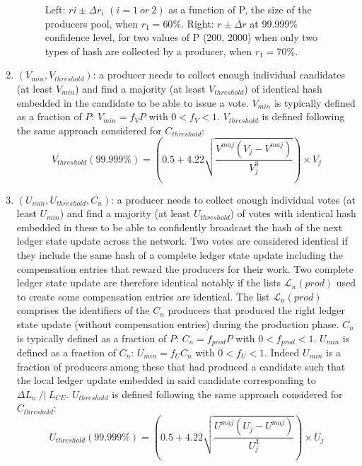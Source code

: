 \begin{enumerate}
\begin{figure}[H]
    \caption{Left: $ri \pm \Delta r_i$ $(i=1~or~2)$ as a function of P, the  size of the producers pool, when $r_1 = 60\%$. Right: $r \pm \Delta r$ at 99.999\% confidence level, for two values of P (200, 2000) when only two types of hash are collected by a producer, when $r_1 = 70\%$.}
    \label{fig:rdeltar}
\end{figure}


\item $(V_{min}, V_{threshold})$: a producer needs to collect enough individual candidates (at least $V_{min}$) and find a majority (at least $V_{threshold}$) of identical hash embedded in the candidate to be able to issue a vote. 
$V_{min}$ is typically defined as a fraction of $P$: $V_{min} = f_V P$ with $0 < f_V < 1$. $V_{threshold}$ is defined following the same approach considered for $C_{threshold}$: 
 \begin{equation}
 V_{threshold}(99.999\%) = \left( 0.5 +  4.22\sqrt{\frac{V^{maj}(V_j-V^{maj})}{V_j^3}} \right) \times V_j
 \end{equation}
 
 \item $(U_{min}, U_{threshold}, C_n)$: a producer needs to collect enough individual votes (at least $U_{min}$) and find a majority (at least $U_{threshold}$) of votes with identical hash embedded in these to be able to confidently broadcast the hash of the next ledger state update across the network. Two votes are considered identical if they include the same hash of a complete ledger state update including the compensation entries that reward the producers for their work. Two complete ledger state update are therefore identical notably if the lists $\mathcal{L}_{n}(prod)$ used to create some compensation entries are identical. The list $\mathcal{L}_{n}(prod)$ comprises the identifiers of the $C_n$ producers that produced the right ledger state update (without compensation entries) during the production phase. $C_{n}$ is typically defined as a fraction of $P$: $C_{n} = f_{prod}P$ with $0 < f_{prod} < 1$.
 $U_{min}$ is defined as a fraction of $C_n$: $U_{min} = f_U C_n$ with $0 < f_U < 1$. Indeed $U_{min}$ is a fraction of producers among these that had produced a candidate such that the local ledger update embedded in said candidate corresponding to $\Delta L_n~/|~L_{CE}$.  $U_{threshold}$ is defined following the same approach considered for $C_{threshold}$: 
 \begin{equation}
 U_{threshold}(99.999\%) = \left( 0.5 +  4.22\sqrt{\frac{U^{maj}(U_j-U^{maj})}{U_j^3}} \right) \times U_j
 \end{equation}

\end{enumerate}


